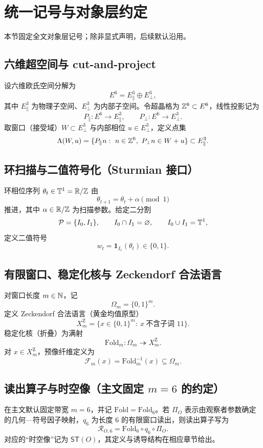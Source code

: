 \section*{统一记号与对象层约定}

本节固定全文对象层记号；除非显式声明，后续默认沿用。

\subsection*{六维超空间与 cut-and-project}
设六维欧氏空间分解为
$$
E^{6}=E_{\parallel}^{3}\oplus E_{\perp}^{3},
$$
其中 $E_{\parallel}^{3}$ 为物理子空间、$E_{\perp}^{3}$ 为内部子空间。令超晶格为 $\mathbb{Z}^{6}\subset E^{6}$，线性投影记为
$$
P_{\parallel}:E^{6}\to E_{\parallel}^{3},\qquad P_{\perp}:E^{6}\to E_{\perp}^{3}.
$$
取窗口（接受域）$W\subset E_{\perp}^{3}$ 与内部相位 $u\in E_{\perp}^{3}$，定义点集
$$
\Lambda(W,u)=\{P_{\parallel}n:\ n\in\ZZ^{6},\ P_{\perp}n\in W+u\}\subset E_{\parallel}^{3}.
$$

\subsection*{环扫描与二值符号化（Sturmian 接口）}
环相位序列 $\theta_t\in \mathbb{T}^1=\mathbb{R}/\mathbb{Z}$ 由
$$
\theta_{t+1}=\theta_t+\alpha\pmod 1
$$
推进，其中 $\alpha\in\mathbb{R}/\mathbb{Z}$ 为扫描参数。给定二分割
$$
\mathcal{P}=\{I_0,I_1\},\qquad I_0\cap I_1=\varnothing,\qquad I_0\cup I_1=\mathbb{T}^1,
$$
定义二值符号
$$
w_t=\mathbf{1}_{I_1}(\theta_t)\in\{0,1\}.
$$

\subsection*{有限窗口、稳定化核与 Zeckendorf 合法语言}
对窗口长度 $m\in\mathbb{N}$，记
$$
\Omega_m=\{0,1\}^{m}.
$$
定义 Zeckendorf 合法语言（黄金均值原型）
$$
X_m^{\mathrm Z}=\{x\in\{0,1\}^{m}:\ x\ \text{不含子词 }11\}.
$$
稳定化核（折叠）为满射
$$
\mathrm{Fold}_m:\Omega_m\twoheadrightarrow X_m^{\mathrm Z}.
$$
对 $x\in X_m^{\mathrm Z}$，预像纤维定义为
$$
\mathcal{F}_m(x)=\mathrm{Fold}_m^{-1}(x)\subseteq \Omega_m.
$$

\subsection*{读出算子与时空像（主文固定 $m=6$ 的约定）}
在主文默认固定带宽 $m=6$，并记 $\mathrm{Fold}=\mathrm{Fold}_6$。若 $\Pi_O$ 表示由观察者参数确定的几何—符号因子映射，$q_6$ 为长度 $6$ 的有限窗口读出，则读出算子写为
$$
\mathcal{R}_{O,6}=\mathrm{Fold}_6\circ q_6\circ \Pi_O.
$$
对应的“时空像”记为 $\mathsf{ST}(O)$，其定义与诱导结构在相应章节给出。

